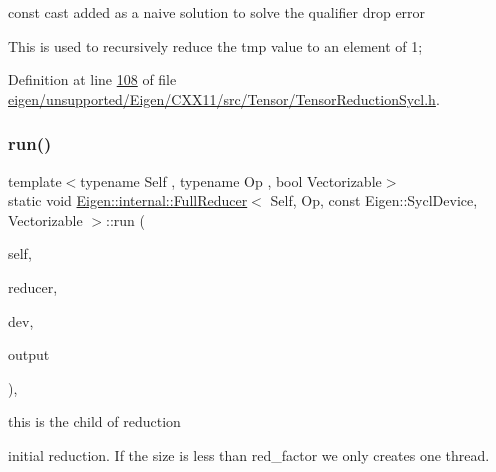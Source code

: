 const cast added as a naive solution to solve the qualifier drop error

This is used to recursively reduce the tmp value to an element of 1; 

Definition at line \hyperlink{eigen_2unsupported_2_eigen_2_c_x_x11_2src_2_tensor_2_tensor_reduction_sycl_8h_source_l00108}{108} of file \hyperlink{eigen_2unsupported_2_eigen_2_c_x_x11_2src_2_tensor_2_tensor_reduction_sycl_8h_source}{eigen/unsupported/\+Eigen/\+C\+X\+X11/src/\+Tensor/\+Tensor\+Reduction\+Sycl.\+h}.

\mbox{\label{struct_eigen_1_1internal_1_1_full_reducer_3_01_self_00_01_op_00_01const_01_eigen_1_1_sycl_device_00_01_vectorizable_01_4_aee608a1f9a8dca2b99477c2738357c05}} 
\subsubsection{\texorpdfstring{run()}{run()}\hspace{0.1cm}{\footnotesize\ttfamily [2/2]}}
{\footnotesize\ttfamily template$<$typename Self , typename Op , bool Vectorizable$>$ \\
static void \hyperlink{struct_eigen_1_1internal_1_1_full_reducer}{Eigen\+::internal\+::\+Full\+Reducer}$<$ Self, Op, const Eigen\+::\+Sycl\+Device, Vectorizable $>$\+::run (\begin{DoxyParamCaption}\item[{const Self \&}]{self,  }\item[{Op \&}]{reducer,  }\item[{const Eigen\+::\+Sycl\+Device \&}]{dev,  }\item[{Coeff\+Return\+Type $\ast$}]{output }\end{DoxyParamCaption})\hspace{0.3cm}{\ttfamily [inline]}, {\ttfamily [static]}}

this is the child of reduction

initial reduction. If the size is less than red\+\_\+factor we only creates one thread.


